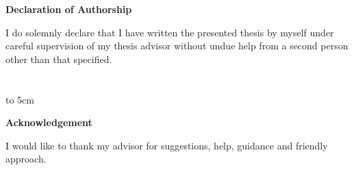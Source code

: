 {\vfill\noindent\mfplacedate\hfill\mfauthor}
\newpage

\pagestyle{plain}

\vspace*{8cm}
\begin{centering}
  {\textbf{Declaration of Authorship}}
\end{centering}
\bigskip\bigskip

\begin{centering}
  \begin{minipage}{0.72\textwidth}
  I do solemnly declare that I have written the presented thesis by myself
  under careful supervision of my thesis advisor without undue help from
  a second person other than that specified.
  \\ \\ \\
  \hfill\hbox to 5cm{\dotfill}
  \end{minipage}
\end{centering}

\newpage

\vspace*{7cm}
\begin{centering}
  {\textbf{Acknowledgement}}
\end{centering}
\bigskip\bigskip

I would like to thank my advisor \mfadvisor for suggestions, help, guidance and
friendly approach.
\vspace{1cm}
